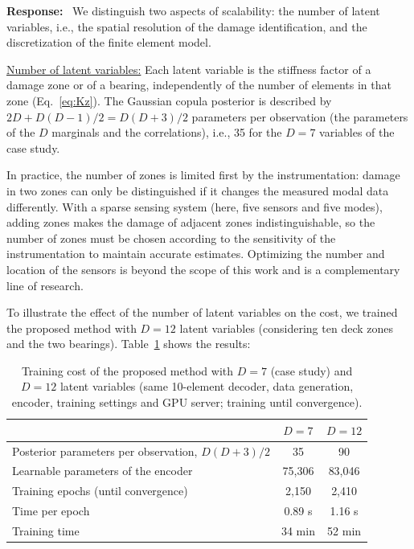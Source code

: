 \documentclass[11pt]{article}
\newenvironment{response}{\par\smallskip\noindent\color{resp}\textbf{Response:}\ }{\par}
\begin{document}
\begin{response}
We distinguish two aspects of scalability: the number of latent variables, i.e., the spatial resolution of the damage identification, and the discretization of the finite element model.

\underline{Number of latent variables:} 
Each latent variable is the stiffness factor of a damage zone or of a bearing, independently of the number of elements in that zone (Eq.~\eqref{eq:Kz}). 
The Gaussian copula posterior is described by $2D+D(D-1)/2=D(D+3)/2$ parameters per observation (the parameters of the $D$ marginals and the correlations), i.e., 35 for the $D=7$ variables of the case study. 

In practice, the number of zones is limited first by
the instrumentation: damage in two zones can only be distinguished if it changes the measured modal data differently.
With a sparse sensing system (here, five sensors and five modes), adding zones makes the damage of adjacent zones indistinguishable, so the number of zones must be chosen according to the sensitivity of the instrumentation to maintain accurate estimates. Optimizing the number and location of the sensors is beyond the scope of this work and is
a complementary line of research.

To illustrate the effect of the number of latent variables on the cost, we trained the
proposed method with $D=12$ latent variables (considering ten deck zones and the two bearings). 
Table~\ref{tab:scal} shows the results:  
\begin{table}[H]
\centering\small
\caption{Training cost of the proposed method with $D=7$ (case study) and $D=12$ latent variables (same 10-element
decoder, data generation, encoder, training settings and GPU server; training until convergence).}
\label{tab:scal}
\begin{tabular}{lcc}
\toprule
 & $D=7$ & $D=12$ \\
\midrule
Posterior parameters per observation, $D(D+3)/2$ & 35 & 90 \\
Learnable parameters of the encoder & 75,306 & 83,046 \\
Training epochs (until convergence) & 2,150 & 2,410 \\
Time per epoch & 0.89 s & 1.16 s \\
Training time & 34 min & 52 min \\
\bottomrule
\end{tabular}
\end{table}


\end{response}
\end{document}
